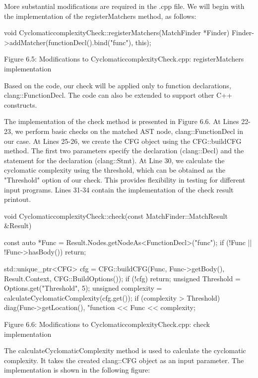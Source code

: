More substantial modifications are required in the .cpp file. We will begin with the implementation of the registerMatchers method, as follows:

\begin{cpp}
void CyclomaticcomplexityCheck::registerMatchers(MatchFinder *Finder) {
  Finder->addMatcher(functionDecl().bind("func"), this);
}
\end{cpp}

\begin{center}
Figure 6.5: Modifications to CyclomaticcomplexityCheck.cpp: registerMatchers implementation
\end{center}

Based on the code, our check will be applied only to function declarations, clang::FunctionDecl. The code can also be extended to support other C++ constructs.

The implementation of the check method is presented in Figure 6.6. At Lines 22-23, we perform basic checks on the matched AST node, clang::FunctionDecl in our case. At Lines 25-26, we create the CFG object using the CFG::buildCFG method. The first two parameters specify the declaration (clang::Decl) and the statement for the declaration (clang::Stmt). At Line 30, we calculate the cyclomatic complexity using the threshold, which can be obtained as the "Threshold" option of our check. This provides flexibility in testing for different input programs. Lines 31-34 contain the implementation of the check result printout.

\begin{cpp}
void CyclomaticcomplexityCheck::check(const MatchFinder::MatchResult &Result) {
  const auto *Func = Result.Nodes.getNodeAs<FunctionDecl>("func");
  if (!Func || !Func->hasBody()) return;

  std::unique_ptr<CFG> cfg =
    CFG::buildCFG(Func, Func->getBody(), Result.Context, CFG::BuildOptions());
  if (!cfg) return;
  unsigned Threshold = Options.get("Threshold", 5);
  unsigned complexity = calculateCyclomaticComplexity(cfg.get());
  if (complexity > Threshold) {
    diag(Func->getLocation(), "function %
      << Func << complexity;
  }
}
\end{cpp}

\begin{center}
Figure 6.6: Modifications to CyclomaticcomplexityCheck.cpp: check implementation
\end{center}

The calculateCyclomaticComplexity method is used to calculate the cyclomatic complexity. It takes the created clang::CFG object as an input parameter. The implementation is shown in the following figure:

